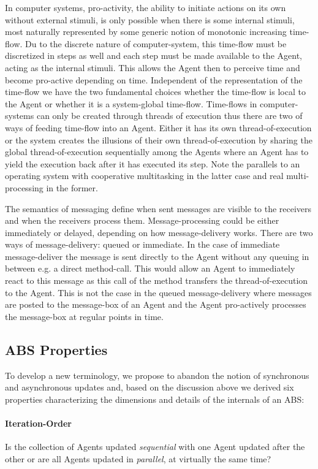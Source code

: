 In computer systems, pro-activity, the ability to initiate actions on its own without external stimuli, is only possible when there is some internal stimuli, most naturally represented by some generic notion of monotonic increasing time-flow. Du to the discrete nature of computer-system, this time-flow must be discretized in steps as well and each step must be made available to the Agent, acting as the internal stimuli. This allows the Agent then to perceive time and become pro-active depending on time. Independent of the representation of the time-flow we have the two fundamental choices whether the time-flow is local to the Agent or whether it is a system-global time-flow. Time-flows in computer-systems can only be created through threads of execution thus there are two of ways of feeding time-flow into an Agent. Either it has its own thread-of-execution or the system creates the illusions of their own thread-of-execution by sharing the global thread-of-execution sequentially among the Agents where an Agent has to yield the execution back after it has executed its step. Note the parallels to an operating system with cooperative multitasking in the latter case and real multi-processing in the former.

\medskip 

The semantics of messaging define when sent messages are visible to the receivers and when the receivers process them. Message-processing could be either immediately or delayed, depending on how message-delivery works. There are two ways of message-delivery: queued or immediate. In the case of immediate message-deliver the message is sent directly to the Agent without any queuing in between e.g. a direct method-call. This would allow an Agent to immediately react to this message as this call of the method transfers the thread-of-execution to the Agent. This is not the case in the queued message-delivery where messages are posted to the message-box of an Agent and the Agent pro-actively processes the message-box at regular points in time.

\subsection{ABS Properties}
To develop a new terminology, we propose to abandon the notion of synchronous and asynchronous updates and, based on the discussion above we derived six properties characterizing the dimensions and details of the internals of an ABS:

\paragraph{Iteration-Order}
Is the collection of Agents updated \textit{sequential} with one Agent updated after the other or are all Agents updated in \textit{parallel}, at virtually the same time?

